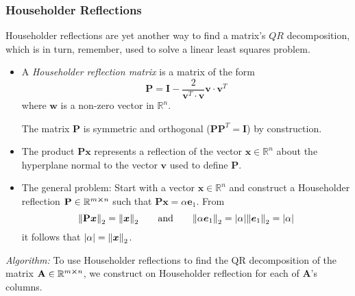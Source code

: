 \documentclass[11pt, a4paper]{article}
\newcommand{\R}{\mathbb{R}} %
\newcommand{\mat}[1]{\mathbf{#1}} %
\begin{document}
\subsubsection{Householder Reflections}
Householder reflections are yet another way to find a matrix's $ QR $ decomposition, which is in turn, remember, used to solve a linear least squares problem.
\begin{itemize}
	\item A \textit{Householder reflection matrix} is a matrix of the form
	\begin{equation*}	
		\mat{P} = \mat{I} - \frac{2}{\bm{v}^{T} \cdot \bm{v}} \bm{v} \cdot \bm{v}^{T}
	\end{equation*}
	where $ \bm{w} $ is a non-zero vector in $ \R^{n} $.
	
	The matrix $ \mat{P} $ is symmetric and orthogonal ($ \mat{P}\mat{P}^{T} = \mat{I} $) by construction.
	
	\item The product $ \mat{P}\bm{x} $ represents a reflection of the vector $ \bm{x} \in \R^{n} $ about the hyperplane normal to the vector $ \bm{v} $ used to define $ \mat{P} $.
	
	\item The general problem: Start with a vector $ \bm{x} \in \R^{n} $ and construct a Householder reflection $ \mat{P} \in \R^{m \cross n} $ such that $ \mat{P}\bm{x} = \alpha \bm{e}_{1} $. From 
	\begin{equation*}
		\norm{\mat{P}\bm{x}}_{2} = \norm{\bm{x}}_{2} \qquad \text{and} \qquad \norm{\alpha \bm{e}_{1}}_{2} = \abs{\alpha}\norm{\bm{e}_{1}}_{2} = \abs{\alpha}
	\end{equation*}
	it follows that $\abs{\alpha} = \norm{\bm{x}}_{2} $.
	
\end{itemize}
\textit{Algorithm:} To use Householder reflections to find the QR decomposition of the matrix $ \mat{A} \in \R^{m \cross n} $, we construct on Householder reflection for each of $ \mat{A} $'s columns.
\end{document}
